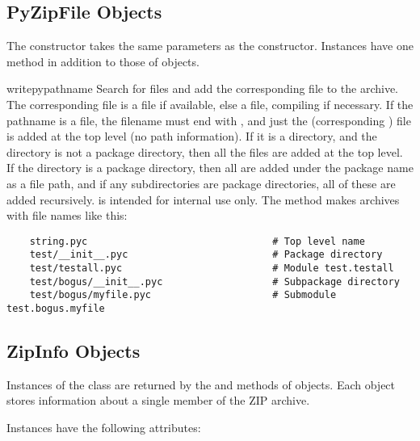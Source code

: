 \subsection{PyZipFile Objects \label{pyzipfile-objects}}

The  constructor takes the same parameters as the
 constructor.  Instances have one method in addition to
those of  objects.

\begin{methoddesc}[PyZipFile]{writepy}{pathname}
  Search for files  and add the corresponding file to the
  archive.  The corresponding file is a  file if
  available, else a  file, compiling if necessary.  If the
  pathname is a file, the filename must end with , and just
  the (corresponding ) file is added at the top level
  (no path information).  If it is a directory, and the directory is
  not a package directory, then all the files  are
  added at the top level.  If the directory is a package directory,
  then all  are added under the package name as a file
  path, and if any subdirectories are package directories, all of
  these are added recursively.   is intended for
  internal use only.  The  method makes archives
  with file names like this:

\begin{verbatim}
    string.pyc                                # Top level name 
    test/__init__.pyc                         # Package directory 
    test/testall.pyc                          # Module test.testall
    test/bogus/__init__.pyc                   # Subpackage directory 
    test/bogus/myfile.pyc                     # Submodule test.bogus.myfile
\end{verbatim}
\end{methoddesc}


\subsection{ZipInfo Objects \label{zipinfo-objects}}

Instances of the  class are returned by the
 and  methods of
 objects.  Each object stores information about a
single member of the ZIP archive.

Instances have the following attributes:

